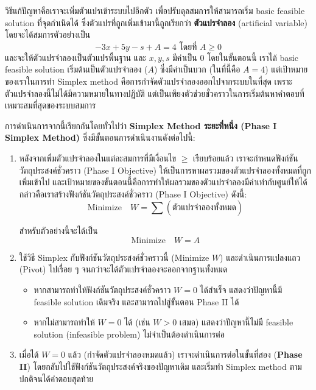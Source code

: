 วิธีแก้ปัญหาคือเราจะเพิ่มตัวแปรเข้าระบบไปอีกตัว เพื่อปรับดุลสมการให้สามารถเริ่ม basic feasible solution ที่จุดกำเนิดได้ ซึ่งตัวแปรที่ถูกเพิ่มเข้ามานี้ถูกเรียกว่า \textbf{ตัวแปรจำลอง} (artificial variable) โดยจะได้สมการตัวอย่างเป็น
$$
-3x + 5y - s + A = 4 \text{ โดยที่ } A\geq 0
$$
และจะให้ตัวแปรจำลองเป็นตัวแปรพื้นฐาน และ $x,y,s$ มีค่าเป็น 0
โดยในขั้นตอนนี้ เราได้ basic feasible solution เริ่มต้นเป็นตัวแปรจำลอง ($A$) ซึ่งมีค่าเป็นบวก (ในที่นี้คือ $A=4$)  
แต่เป้าหมายของเราในการทำ Simplex method คือการกำจัดตัวแปรจำลองออกไปจากระบบในที่สุด เพราะตัวแปรจำลองนี้ไม่ได้มีความหมายในทางปฏิบัติ แต่เป็นเพียงตัวช่วยชั่วคราวในการเริ่มต้นหาคำตอบที่เหมาะสมที่สุดของระบบสมการ

การดำเนินการจากนี้เรียกกันโดยทั่วไปว่า \textbf{Simplex Method ระยะที่หนึ่ง (Phase I Simplex Method)} ซึ่งมีขั้นตอนการดำเนินงานดังต่อไปนี้:

\begin{enumerate}
    \item หลังจากเพิ่มตัวแปรจำลองในแต่ละสมการที่มีเงื่อนไข $\geq$ เรียบร้อยแล้ว เราจะกำหนดฟังก์ชันวัตถุประสงค์ชั่วคราว (Phase I Objective) ให้เป็นการหาผลรวมของตัวแปรจำลองทั้งหมดที่ถูกเพิ่มเข้าไป และเป้าหมายของขั้นตอนนี้คือการทำให้ผลรวมของตัวแปรจำลองมีค่าเท่ากับศูนย์ให้ได้ กล่าวคือเราสร้างฟังก์ชันวัตถุประสงค์ชั่วคราว (Phase I Objective) ดังนี้:
\[
\text{Minimize}\quad W = \sum (\text{ตัวแปรจำลองทั้งหมด})
\]

สำหรับตัวอย่างนี้จะได้เป็น
\[
\text{Minimize}\quad W = A
\]

    \item ใช้วิธี Simplex กับฟังก์ชันวัตถุประสงค์ชั่วคราวนี้ (Minimize $W$) และดำเนินการแปลงแถว (Pivot) ไปเรื่อย ๆ จนกว่าจะได้ตัวแปรจำลองจะออกจากฐานทั้งหมด

\begin{itemize}
    \item หากสามารถทำให้ฟังก์ชันวัตถุประสงค์ชั่วคราว $W=0$ ได้สำเร็จ แสดงว่าปัญหานี้มี feasible solution เดิมจริง และสามารถไปสู่ขั้นตอน Phase II ได้
    \item หากไม่สามารถทำให้ $W=0$ ได้ (เช่น $W>0$ เสมอ) แสดงว่าปัญหานี้ไม่มี feasible solution (infeasible problem) ไม่จำเป็นต้องดำเนินการต่อ
\end{itemize}

    \item เมื่อได้ $W=0$ แล้ว (กำจัดตัวแปรจำลองหมดแล้ว) เราจะดำเนินการต่อในขั้นที่สอง (\textbf{Phase II}) โดยกลับไปใช้ฟังก์ชันวัตถุประสงค์จริงของปัญหาเดิม และเริ่มทำ Simplex method ตามปกติจนได้คำตอบสุดท้าย
\end{enumerate}

